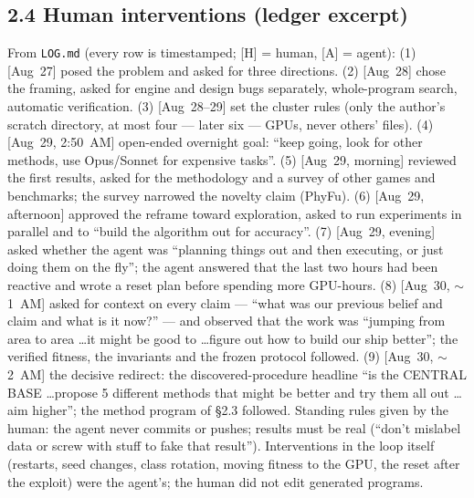 \subsection*{2.4 Human interventions (ledger excerpt)}
From \texttt{LOG.md} (every row is timestamped; [H] = human, [A] = agent): (1) [Aug~27] posed the problem and asked for three directions.
(2) [Aug~28] chose the framing, asked for engine and design bugs separately, whole-program search, automatic verification. (3) [Aug~28--29] set the
cluster rules (only the author's scratch directory, at most four --- later six --- GPUs, never others' files). (4) [Aug~29, 2:50~AM] open-ended overnight
goal: ``keep going, look for other methods, use Opus/Sonnet for expensive tasks''. (5) [Aug~29, morning] reviewed the first results, asked for the
methodology and a survey of other games and benchmarks; the survey narrowed the novelty claim (PhyFu). (6) [Aug~29, afternoon] approved the reframe
toward exploration, asked to run experiments in parallel and to ``build the algorithm out for accuracy''. (7) [Aug~29, evening] asked whether the agent was
``planning things out and then executing, or just doing them on the fly''; the agent answered that the last two hours had been reactive and wrote a
reset plan before spending more GPU-hours. (8) [Aug~30, $\sim$1~AM] asked for context on every claim --- ``what was our previous belief and claim and what is it
now?'' --- and observed that the work was ``jumping from area to area \ldots it might be good to \ldots figure out how to build our ship better'';
the verified fitness, the invariants and the frozen protocol followed. (9) [Aug~30, $\sim$2~AM] the decisive redirect: the discovered-procedure headline
``is the CENTRAL BASE \ldots propose 5 different methods that might be better and try them all out \ldots aim higher''; the method program of \S2.3
followed. Standing rules given by the human: the agent never commits or pushes; results must be real (``don't mislabel data or screw with stuff to
fake that result''). Interventions in the loop itself (restarts, seed changes, class rotation, moving fitness to the GPU, the reset after the
exploit) were the agent's; the human did not edit generated programs.



